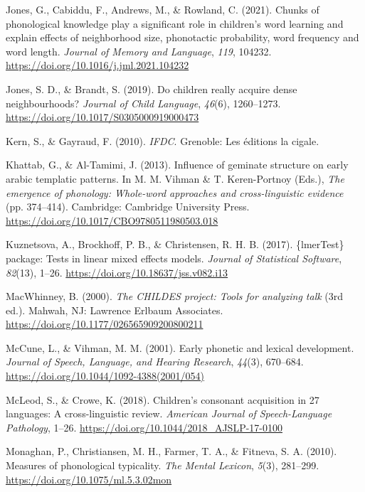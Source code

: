 \documentclass[
  english,
  man,floatsintext]{apa6}
\begin{document}
\leavevmode\hypertarget{ref-jones_chunks_2021}{}%
Jones, G., Cabiddu, F., Andrews, M., \& Rowland, C. (2021). Chunks of phonological knowledge play a significant role in children's word learning and explain effects of neighborhood size, phonotactic probability, word frequency and word length. \emph{Journal of Memory and Language}, \emph{119}, 104232. \url{https://doi.org/10.1016/j.jml.2021.104232}

\leavevmode\hypertarget{ref-jones_children_2019}{}%
Jones, S. D., \& Brandt, S. (2019). Do children really acquire dense neighbourhoods? \emph{Journal of Child Language}, \emph{46}(6), 1260--1273. \url{https://doi.org/10.1017/S0305000919000473}

\leavevmode\hypertarget{ref-kern_sophie_ifdc_2010}{}%
Kern, S., \& Gayraud, F. (2010). \emph{IFDC}. Grenoble: Les éditions la cigale.

\leavevmode\hypertarget{ref-khattab_influence_2013}{}%
Khattab, G., \& Al-Tamimi, J. (2013). Influence of geminate structure on early arabic templatic patterns. In M. M. Vihman \& T. Keren-Portnoy (Eds.), \emph{The emergence of phonology: Whole-word approaches and cross-linguistic evidence} (pp. 374--414). Cambridge: Cambridge University Press. \url{https://doi.org/10.1017/CBO9780511980503.018}

\leavevmode\hypertarget{ref-kuznetsova_lmertest_2017}{}%
Kuznetsova, A., Brockhoff, P. B., \& Christensen, R. H. B. (2017). \{lmerTest\} package: Tests in linear mixed effects models. \emph{Journal of Statistical Software}, \emph{82}(13), 1--26. \url{https://doi.org/10.18637/jss.v082.i13}

\leavevmode\hypertarget{ref-macwhinney_childes_2000}{}%
MacWhinney, B. (2000). \emph{The CHILDES project: Tools for analyzing talk} (3rd ed.). Mahwah, NJ: Lawrence Erlbaum Associates. \url{https://doi.org/10.1177/026565909200800211}

\leavevmode\hypertarget{ref-mccune_early_2001}{}%
McCune, L., \& Vihman, M. M. (2001). Early phonetic and lexical development. \emph{Journal of Speech, Language, and Hearing Research}, \emph{44}(3), 670--684. \url{https://doi.org/10.1044/1092-4388(2001/054)}

\leavevmode\hypertarget{ref-mcleod_childrens_2018}{}%
McLeod, S., \& Crowe, K. (2018). Children's consonant acquisition in 27 languages: A cross-linguistic review. \emph{American Journal of Speech-Language Pathology}, 1--26. \url{https://doi.org/10.1044/2018_AJSLP-17-0100}

\leavevmode\hypertarget{ref-monaghan_measures_2010}{}%
Monaghan, P., Christiansen, M. H., Farmer, T. A., \& Fitneva, S. A. (2010). Measures of phonological typicality. \emph{The Mental Lexicon}, \emph{5}(3), 281--299. \url{https://doi.org/10.1075/ml.5.3.02mon}
\end{document}

